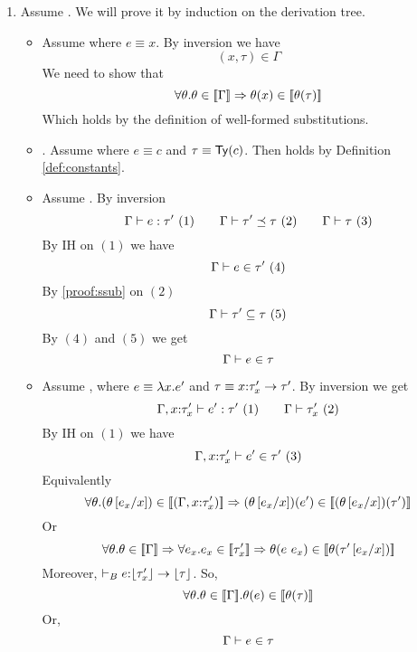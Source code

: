 \begin{enumerate}
\item Assume . 
We will prove it by induction on the derivation tree.
\begin{itemize}
\item\rtvar Assume 
	where $e \equiv x$.
	By inversion we have
	$$(x,\tau) \in \Gamma$$
	We need to show that 
	$$	\forall \theta . \iswellformedtheta{\Gamma}{\theta} 
		\Rightarrow \thetasub{\theta}{x} \in \interp{\thetasub{\theta}{\tau}}$$
	Which holds by the definition of well-formed substitutions.

\item\rtconst. Assume 
	where $e \equiv c$  and $\tau\equiv\constty{c}$.
	Then  holds by Definition \ref{def:constants}.

\item\rtsub Assume .
	By inversion
	$$
	\hastype{\Gamma}{e}{\tau'}\ (1) \qquad
	\issubtype{\Gamma}{\tau'}{\tau}\ (2) \qquad
	\iswellformed{\Gamma}{\tau}\ (3)
	$$
%
	By IH on $(1)$ we have
	$$\shastype{\Gamma}{e}{\tau'}\ (4)$$
%
	By \ref{proof:ssub} on $(2)$
	$$\sissubtype{\Gamma}{\tau'}{\tau}\ (5)$$
%
	By $(4)$ and $(5)$ we get
	$$\shastype{\Gamma}{e}{\tau}$$

\item\rtfun Assume ,
	where $e \equiv \efun{x}{}{e'}$ and 
	$\tau \equiv\tfun{x}{\tau'_x}{\tau'}$.
	By inversion we get
	$$
	\hastype{\Gamma, x\colon\tau'_x}{e'}{\tau'}\ (1) \qquad
	\iswellformed{\Gamma}{\tau'_x}\ (2)
	$$
	By IH on $(1)$ we have
	$$
	\shastype{\Gamma, x\colon\tau'_x}{e'}{\tau'}\ (3)
	$$
	Equivalently
	$$	
	\forall \theta . \iswellformedtheta{(\Gamma,x\colon\tau'_x)}{(\theta\sub{x}{e_x})} 
		\Rightarrow \thetasub{(\theta\sub{x}{e_x})}{e'} \in 
		\interp{\thetasub{(\theta\sub{x}{e_x})}{\tau'}}\\
	$$
	Or
	$$	
	\forall \theta . \iswellformedtheta{\Gamma}{\theta} \Rightarrow
	\forall e_x . e_x \in \interp{\tau'_x} \Rightarrow
		\thetasub{\theta}{\eapp{e}{e_x}} \in \interp{\thetasub{\theta}{\tau'\sub{x}{e_x}}}\\
	$$
%
	Moreover, $\hastypebase{}{e}{\erase{\tau'_x}\rightarrow{\erase{\tau}}}$.
%
	So,
	$$	
	\forall \theta . \iswellformedtheta{\Gamma}{\theta}. \thetasub{\theta}{e}\in \interp{\thetasub{\theta}{\tau}}
	$$
	Or, $$\shastype{\Gamma}{e}{\tau}$$


\end{itemize}
\end{enumerate}
